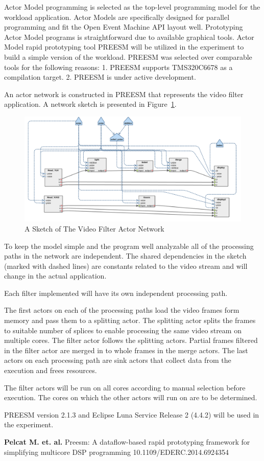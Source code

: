 Actor Model programming is selected as the top-level programming model for the workload application. Actor Models are specifically designed for parallel programming and fit the Open Event Machine API layout well. Prototyping Actor Model programs is straightforward due to available graphical tools. Actor Model rapid prototyping tool PREESM will be utilized in the experiment to build a simple version of the workload. PREESM was selected over comparable tools for the following reasons: 1. PREESM supports TMS320C6678 as a compilation target. 2. PREESM is under active development.

An actor network is constructed in PREESM that represents the video filter application. A network sketch is presented in Figure~\ref{sketch}.

\begin{figure}[h!]
\begin{center}
\includegraphics[width=1.3\textwidth,natwidth=2250,natheight=1090]{preesm_gauss.png}
\caption{A Sketch of The Video Filter Actor Network}\label{sketch}
\end{center}
\end{figure}

To keep the model simple and the program well analyzable all of the processing paths in the network are independent. The shared dependencies in the sketch (marked with dashed lines) are constants related to the video stream and will change in the actual application.

Each filter implemented will have its own independent processing path.

The first actors on each of the processing paths load the video frames form memory and pass them to a splitting actor. The splitting actor splits the frames to suitable number of splices to enable processing the same video stream on multiple cores. The filter actor follows the splitting actors. Partial frames filtered in the filter actor are merged in to whole frames in the merge actors. The last actors on each processing path are sink actors that collect data from the execution and frees resources.

The filter actors will be run on all cores according to manual selection before execution. The cores on which the other actors will run on are to be determined.

PREESM version 2.1.3 and Eclipse Luna Service Release 2 (4.4.2) will be used in the experiment.

\textbf{Pelcat M. et. al.} Preesm: A dataflow-based rapid prototyping framework for simplifying multicore DSP programming 10.1109/EDERC.2014.6924354
